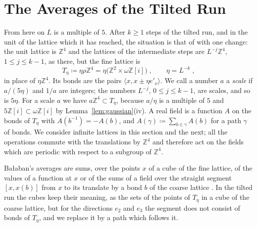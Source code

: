 \documentclass[11pt]{preprint}
\numberwithin{equation}{section}
\theoremstyle{definition}
\theoremstyle{remark}
\theoremstyle{plain}
\begin{document}
\section{The Averages of the Tilted Run}\label{sec:averages}

From here on $L$ is a multiple of $5$. After $k \geq 1$ steps of the tilted run, and in the unit of the lattice which it has reached, the situation is that of \cite[Section~B]{BalabanPRT1} with one change: the unit lattice is $\mathbb Z^4$ and the lattices of the intermediate steps are $L^{-j}\mathbb Z^4$, $1 \leq j \leq k - 1$, as there, but the fine lattice is
\begin{equation}\label{eq:fine-lattice}
    T_\eta \coloneqq \eta\rho\mathbb Z^4 = \eta\bigl(\mathbb Z^2 \times \omega\mathbb Z[i]\bigr)\;,
    \qquad
    \eta = L^{-k}\;,
\end{equation}
in place of $\eta\mathbb Z^4$. Its bonds are the pairs $\langle x, x \pm \eta e'_\nu\rangle$. We call a number $a$ a \emph{scale} if $a/(5\eta)$ and $1/a$ are integers; the numbers $L^{-j}$, $0 \leq j \leq k - 1$, are scales, and so is $5\eta$. For a scale $a$ we have $a\mathbb Z^4 \subset T_\eta$, because $a/\eta$ is a multiple of $5$ and $5\mathbb Z[i] \subset \omega\mathbb Z[i]$ by Lemma~\ref{lem:gaussian}(iv). A real field is a function $A$ on the bonds of $T_\eta$ with $A(b^{-1}) = -A(b)$, and $A(\gamma) \coloneqq \sum_{b \in \gamma}A(b)$ for a path $\gamma$ of bonds. We consider infinite lattices in this section and the next; all the operations commute with the translations by $\mathbb Z^4$ and therefore act on the fields which are periodic with respect to a subgroup of $\mathbb Z^4$.

Ba{\l}aban's averages are sums, over the points $x$ of a cube of the fine lattice, of the values of a function at $x$ or of the sums of a field over the straight segment $[x, x(b)]$ from $x$ to its translate by a bond $b$ of the coarse lattice \cite[(1.6), (1.11), (1.18), pp.~18--20]{BalabanPRT1}. In the tilted run the cubes keep their meaning, as the sets of the points of $T_\eta$ in a cube of the coarse lattice, but for the directions $e_2$ and $e_3$ the segment does not consist of bonds of $T_\eta$, and we replace it by a path which follows it.
\end{document}
